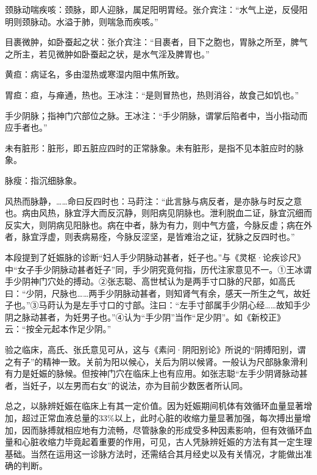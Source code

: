 \documentclass[12pt]{ctexbook}
\begin{document}

\begin{jiaozhu}
	\item 颈脉动喘疾咳：颈脉，即人迎脉，属足阳明胃经。张介宾注：“水气上逆，反侵阳明则颈脉动。水溢于肺，则喘急而疾咳。”
	\item 目裹微肿，如卧蚕起之状：张介宾注：“目裹者，目下之胞也，胃脉之所至，脾气之所主，若见微肿如卧蚕起之状，是水气淫及脾胃也。”
	\item 黄疸：病证名，多由湿热或寒湿内阻中焦所致。
	\item 胃疸：疸，与瘅通，热也。王冰注：“是则冒热也，热则消谷，故食己如饥也。”
	\item 手少阴脉；指神门穴部位之脉。王冰注：“手少阴脉，谓掌后陷者中，当小指动而应手者也。”
	\item 未有脏形：脏形，即五脏应四时的正常脉象。未有脏形，是指不见本脏应时的脉象。
	\item 脉瘦：指沉细脉象。
	\item 风热而脉静，……命曰反四时也：马莳注：“此言脉与病反者，是亦脉与时反之意也。病由风热，脉宜浮大而反沉静，则阳病见阴脉也。泄利脱血二证，脉宜沉细而反实大，则阴病见阳脉也。病在中者，脉为有力，则中气方盛，今脉反虚；病在外者，脉宜浮虚，则表病易痊，今脉反涩坚，是皆难治之证，犹脉之反四时也。”
\end{jiaozhu}



本段提到了妊娠脉的诊断“妇人手少阴脉动甚者，妊子也。”与《灵枢·论疾诊尺》中“女子手少阴脉动甚者妊子”同，手少阴究竟何指，历代注家意见不一。①王冰谓手少阴神门穴处的搏动。②张志聪、高世栻认为是两手寸口脉的尺部，如高氏曰：“少阴，尺脉也……两手少阴脉动甚者，则知肾气有余，感天一所生之气，故妊子也。”③马莳认为是左手寸口的寸部。注曰：“左手寸部属手少阴心经……故知手少阴之脉动甚者，为妊男子也。”④认为“手少阴”当作“足少阴”。如《新校正》云：“按全元起本作足少阴。”

验之临床，高氏、张氏意见可从，这与《素问·阴阳别论》所说的“阴搏阳别，谓之有子”的精神一致。关前为阳以候心，关后为阴以候肾。一般认为尺部脉象滑利有力是妊娠的脉候。但按神门穴在临床上也有应用。如张志聪“左手少阴肾脉动甚者，当妊子，以左男而右女”的说法，亦为目前少数医者所认同。

总之，以脉辨妊娠在临床上有其一定价值。因为妊娠期间机体有效循环血量显著增加，超过正常血液总量的33\%以上，此时心脏的收缩力量显著加强，每次搏出量增加，因而脉搏就相应地有力流畅，尽管脉象的形成受多种因素影响，但有效循环血量和心脏收缩力毕竟起着重要的作用，可见，古人凭脉辨妊娠的方法有其一定生理基础。当然在运用这一诊脉方法时，还需结合其月经史以及有关情况，才能做出准确的判断。
\end{document}
